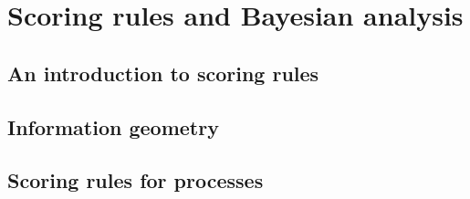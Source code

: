 \part{Scoring rules and Bayesian analysis}

\chapter{An introduction to scoring rules}


\chapter{Information geometry}


\chapter{Scoring rules for processes}
